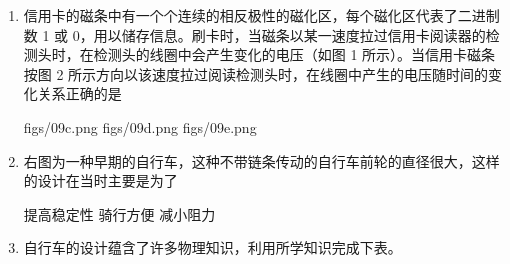 \documentclass[\gkver]{gaokaozhenti}
\begin{document}
\begin{enumerate}

则以下表述正确的是

①四个挡光片中，挡光片Ⅰ的宽度最小

②四个挡光片中，挡光片Ⅳ的宽度最小

③四次实验中，第一次实验测得的速度最接近小车车头到达光电门时的瞬时速度

④四次实验中，第四次实验测得的速度最接近小车车头到达光电门时的瞬时速度

{②③}
{①④}
{②④}


\item
信用卡的磁条中有一个个连续的相反极性的磁化区，每个磁化区代表了二进制数 1 或 0，用以储存信息。刷卡时，当磁条以某一速度拉过信用卡阅读器的检测头时，在检测头的线圈中会产生变化的电压（如图 1 所示）。当信用卡磁条按图 2 所示方向以该速度拉过阅读检测头时，在线圈中产生的电压随时间的变化关系正确的是


{figs/09c.png}
{figs/09d.png}
{figs/09e.png}


\item
右图为一种早期的自行车，这种不带链条传动的自行车前轮的直径很大，这样的设计在当时主要是为了


{提高稳定性}
{骑行方便}
{减小阻力}


\item
自行车的设计蕴含了许多物理知识，利用所学知识完成下表。


\end{enumerate}
\end{document}
